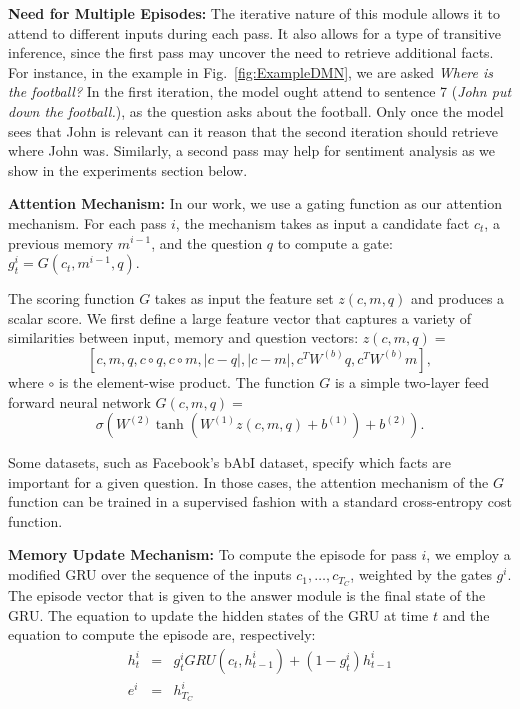 \documentclass{article}
\begin{document}
\textbf{Need for Multiple Episodes:}
The iterative nature of this module allows it to attend to different inputs during each pass. It also allows for a type of transitive inference, since the first pass may uncover the need to retrieve additional facts. For instance, in the example in Fig.~\ref{fig:ExampleDMN}, we are asked \emph{Where is the football?} In the first iteration, the model ought attend to sentence 7 (\emph{John put down the football.}), as the question asks about the football. Only once the model sees that John is relevant can it reason that the second iteration should retrieve where John was. Similarly, a second pass may help for sentiment analysis as we show in the experiments section below.


\textbf{Attention Mechanism:}
In our work, we use a gating function as our attention mechanism. For each pass $i$, the mechanism takes as input a candidate fact $c_t$, a previous memory $m^{i-1}$, and the question $q$ to compute a gate: $g^i_t = G(c_t, m^{i-1}, q)$. 

The scoring function $G$ takes as input the feature set $z(c,m,q)$ and produces a scalar score. We first define a large feature vector that captures a variety of similarities between input, memory and question vectors: $z(c, m, q)=$ 
\begin{equation}
\left[c, m, q, c \circ q, c \circ m, \lvert c - q \rvert, \lvert c - m \rvert, c^T W^{(b)} q, c^T W^{(b)} m \right],
\end{equation}
where $\circ$ is the element-wise product. The function $G$ is a simple two-layer feed forward neural network $G(c,m,q)=$
\begin{equation}
 \sigma\left(W^{(2)} \tanh \left(W^{(1)} z(c, m, q) + b^{(1)}\right) + b^{(2)}\right).
\end{equation}

Some datasets, such as Facebook's bAbI dataset, specify which facts are important for a given question. In those cases, the attention mechanism of the $G$ function can be trained in a supervised fashion with a standard cross-entropy cost function. 

\textbf{Memory Update Mechanism:} To compute the episode for pass $i$, we employ a modified GRU over the sequence of the inputs $c_1,\ldots,c_{T_C}$, weighted by the gates $g^i$. The episode vector that is given to the answer module is the final state of the GRU. The equation to update the hidden states of the GRU at time $t$ and the equation to compute the episode are, respectively:
\begin{eqnarray}
h^i_t &=& g^i_t GRU(c_t, h^i_{t-1}) + (1-g^i_t) h^i_{t-1}\\
e^i &=& h^i_{T_C}\label{eq:ep}
\end{eqnarray}
\end{document}
